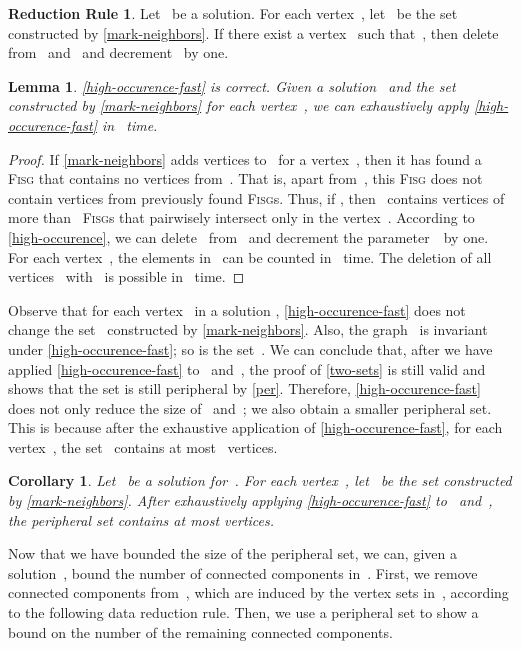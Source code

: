 \documentclass[12pt, a4paper, abstracton]{scrreprt}
\newcommand{\premv}[1]{Let~ be a solution. For each vertex~, let~ be the set constructed by \autoref{#1}.}
\newcommand{\FISG}{\textsc{Fisg}}
\newcounter{theorem}
\newtheorem{korollar}{Corollary}[chapter]
\newtheorem{lemma}{Lemma}[chapter]
\theoremstyle{definition}
\newtheorem{rul}{Reduction Rule}[chapter]
\theoremstyle{remark}
\begin{document}
\begin{rul}\label{high-occurence-fast}
  \premv{mark-neighbors} If there exist a vertex~ such that~, then delete~ from~ and~ and decrement~ by one.
\end{rul}

\begin{lemma}\label{high-occurence-time}
  \autoref{high-occurence-fast} is correct. Given a solution~ and the set~ constructed by \autoref{mark-neighbors} for each vertex~, we can exhaustively apply \autoref{high-occurence-fast} in ~time.
\end{lemma}

\begin{proof}
  If \autoref{mark-neighbors} adds vertices to~ for a vertex~, then it has found a \FISG{} that contains no vertices from~. That is, apart from~, this \FISG{} does not contain vertices from previously found \FISG{}s. Thus, if , then ~contains vertices of more than ~\FISG{}s that pairwisely intersect only in the vertex~. According to \autoref{high-occurence}, we can delete~ from~ and decrement the parameter~~by one. For each vertex~, the elements in~ can be counted in ~time. The deletion of all vertices~ with~ is possible in ~time.
\end{proof}

\noindent Observe that for each vertex~ in a solution , \autoref{high-occurence-fast} does not change the set~ constructed by \autoref{mark-neighbors}. Also, the graph~ is invariant under \autoref{high-occurence-fast}; so is the set~. We can conclude that, after we have applied \autoref{high-occurence-fast} to~ and~, the proof of \autoref{two-sets} is still valid and shows that the set  is still peripheral by \autoref{per}. Therefore, \autoref{high-occurence-fast} does not only reduce the size of~ and~; we also obtain a smaller peripheral set. This is because after the exhaustive application of \autoref{high-occurence-fast}, for each vertex~, the set~ contains at most~ vertices.

\begin{korollar}\label{size-M}
  Let~ be a solution for~. For each vertex~, let~ be the set constructed by \autoref{mark-neighbors}. After exhaustively applying \autoref{high-occurence-fast} to~ and~, the peripheral set  contains at most  vertices.
\end{korollar}

\noindent 
Now that we have bounded the size of the peripheral set, we can, given a solution~, bound the number of connected components in~. First, we remove connected components from~, which are induced by the vertex sets in~, according to the following data reduction rule. Then, we use a peripheral set to show a bound on the number of the remaining connected components.
\end{document}
